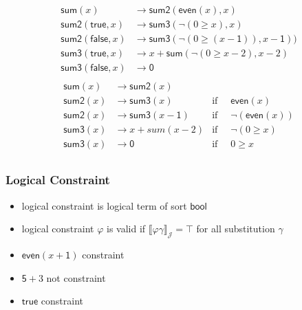 \documentclass[12pt,aspectratio=169]{beamer}
\newcommand{\m}[1]{\mathsf{#1}}
\newcommand{\JJ}{\mathcal{J}}
\begin{document}
\begin{frame}
        \begin{align*}
        \m{sum}(x) &\to \m{sum2}(\m{even}(x),x) \\
        \m{sum2}(\m{true}, x) &\to \m{sum3}(\neg(0 \geq x), x) \\
        \m{sum2}(\m{false}, x) &\to \m{sum3}(\neg(0 \geq (x-\m{1})), x - \m{1}))\\
        \m{sum3}(\m{true}, x) &\to x + \m{sum}(\neg(0 \geq x-2), x-2) \\
        \m{sum3}(\m{false},x) &\to \m{0}\\
        \end{align*}
        \pause
        \vspace{-10mm}
        \begin{align*}
            \m{sum}(x) &\to \m{sum2}(x) &\\
            \m{sum2}(x) &\to \m{sum3}(x) & \text{if} & \;\; \m{even}(x)\\
            \m{sum2}(x) &\to \m{sum3}(x-\m{1}) & \text{if} & \;\; \neg(\m{even}(x))\\
            \m{sum3}(x) &\to x + {sum}(x-2) & \text{if} & \;\; \neg(0 \geq x)  \\
            \m{sum3}(x) &\to \m{0} & \text{if} & \;\;0 \geq x \\
        \end{align*}
\end{frame}

\begin{frame}
    \frametitle{Logical Constraint}
    \begin{definition}
        \begin{itemize}
            \item \alert{logical constraint} is logical term of sort \alert{$\m{bool}$} %
                \pause
        \item logical constraint $\varphi$ is \alert{valid} if $\llbracket \varphi\gamma \rrbracket_\JJ = \top$ for all substitution $\gamma$
        \end{itemize}
    \end{definition}
    \pause
    \begin{example}
        \begin{itemize}[<+->]
            \item $\m{even}(x + \m{1})$ \quad \pause constraint
            \item $\m{5} + {3}$ \quad \pause not constraint
            \item $\m{true}$ \quad \pause constraint
        \end{itemize}
    \end{example}
\end{frame}
\end{document}
